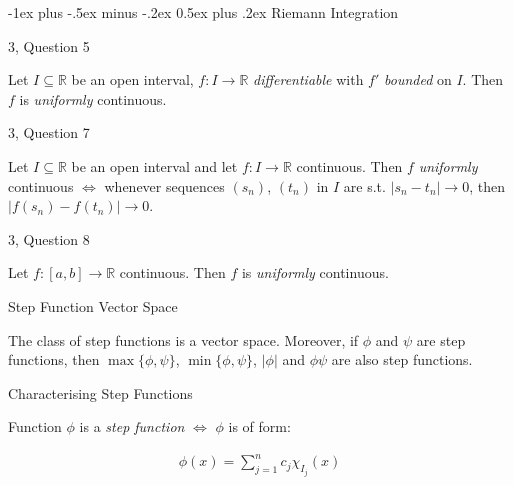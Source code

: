 \documentclass[10pt]{article} %
\makeatletter
\newcommand{\cws}[2]{#1, Question #2}
\renewcommand{\section}{\@startsection{section}{1}{0mm}%
                                {-1ex plus -.5ex minus -.2ex}%
                                {0.5ex plus .2ex}%
                                {\normalfont\large\bfseries}}
\makeatother
\begin{document}
\begin{multicols}{3}
\section{Riemann Integration}

\begin{workshop}{\cws{3}{5}}{}

    Let $I \subseteq \mathbb{R}$ be an open interval, $f: I \to \mathbb{R}$ \emph{differentiable} with $f'$ \emph{bounded} on $I$. Then $f$ is \emph{uniformly} continuous.

\end{workshop}

\begin{workshop}{\cws{3}{7}}{}

    Let $I \subseteq \mathbb{R}$ be an open interval and let $f: I \to \mathbb{R}$ continuous. Then $f$ \emph{uniformly} continuous $\Leftrightarrow$ whenever sequences $(s_n)$, $(t_n)$ in $I$ are s.t. $|s_n - t_n| \to 0$, then $|f(s_n) - f(t_n)| \to 0$.

\end{workshop}

\begin{workshop}{\cws{3}{8}}{}

    Let $f: [a,b] \to \mathbb{R}$ continuous. Then $f$ is \emph{uniformly} continuous.

\end{workshop}

\begin{exercise}{}{Step Function Vector Space}

    The class of step functions is a vector space. Moreover, if $\phi$ and $\psi$ are step functions, then $\max\{\phi,\psi\}$, $\min\{\phi,\psi\}$, $|\phi|$ and $\phi \psi$ are also step functions.

\end{exercise}

\begin{exercise}{}{Characterising Step Functions}

    Function $\phi$ is a \emph{step function} $\Leftrightarrow$ $\phi$ is of form:

        \begin{align*}
            \phi(x) = \sum_{j = 1}^n c_j \chi_{I_j}(x)
        \end{align*}


\end{exercise}
\end{multicols}
\end{document}
